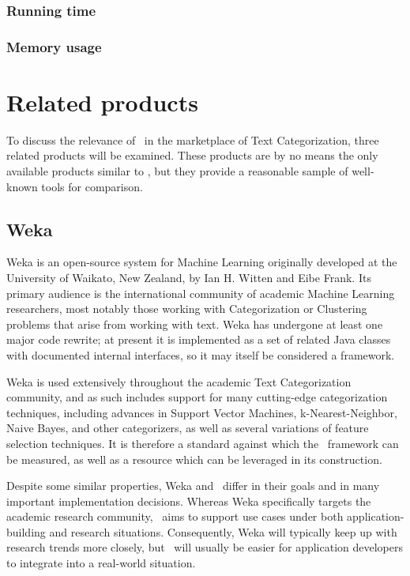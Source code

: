 \subsubsection{Running time}
\subsubsection{Memory usage}

\section{Related products}

To discuss the relevance of \aicat\ in the marketplace of Text
Categorization, three related products will be examined.  These
products are by no means the only available products similar to
\aicat, but they provide a reasonable sample of well-known tools for
comparison.

\subsection{Weka}

Weka is an open-source system for Machine Learning originally
developed at the University of Waikato, New Zealand, by Ian H. Witten
and Eibe Frank.\cite{weka} Its primary
audience is the international community of academic Machine Learning
researchers, most notably those working with Categorization or
Clustering problems that arise from working with text.  Weka has
undergone at least one major code rewrite; at present it is
implemented as a set of related Java classes with documented internal
interfaces, so it may itself be considered a framework.

Weka is used extensively throughout the academic Text Categorization
community, and as such includes support for many cutting-edge
categorization techniques, including advances in Support Vector
Machines, k-Nearest-Neighbor, Naive Bayes, and other categorizers, as
well as several variations of feature selection techniques.  It is
therefore a standard against which the \aicat\ framework can
be measured, as well as a resource which can be leveraged in its
construction.

Despite some similar properties, Weka and \aicat\ differ in
their goals and in many important implementation decisions.  Whereas
Weka specifically targets the academic research community,
\aicat\ aims to support use cases under both
application-building and research situations.
Consequently, Weka will typically keep up with research trends more
closely, but \aicat\ will usually be easier for application
developers to integrate into a real-world situation.

